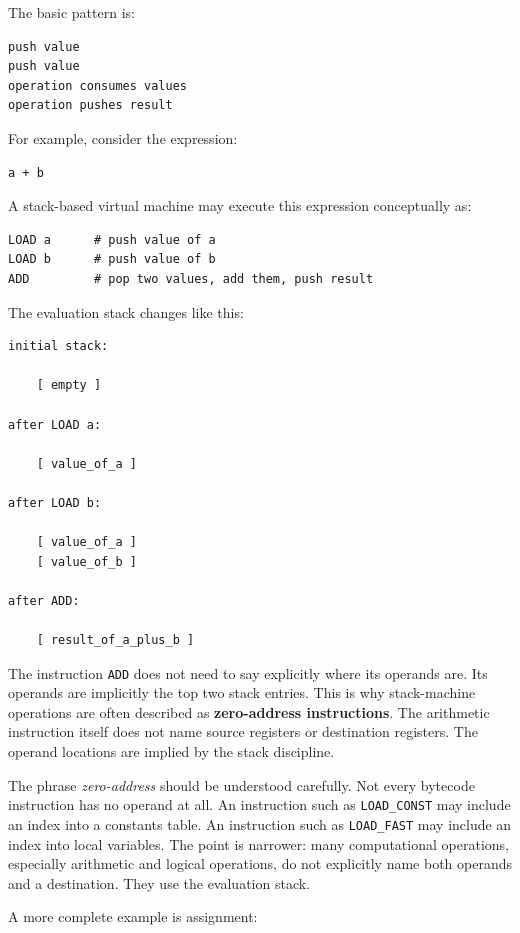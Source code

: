 \documentclass[a4paper,twoside]{report}
\begin{document}
The basic pattern is:

\begin{verbatim}
push value
push value
operation consumes values
operation pushes result
\end{verbatim}

For example, consider the expression:

\begin{verbatim}
a + b
\end{verbatim}

A stack-based virtual machine may execute this expression conceptually as:

\begin{verbatim}
LOAD a      # push value of a
LOAD b      # push value of b
ADD         # pop two values, add them, push result
\end{verbatim}

The evaluation stack changes like this:

\begin{verbatim}
initial stack:

    [ empty ]

after LOAD a:

    [ value_of_a ]

after LOAD b:

    [ value_of_a ]
    [ value_of_b ]

after ADD:

    [ result_of_a_plus_b ]
\end{verbatim}

The instruction \texttt{ADD} does not need to say explicitly where its operands are. Its operands are implicitly the top two stack entries. This is why stack-machine operations are often described as \textbf{zero-address instructions}. The arithmetic instruction itself does not name source registers or destination registers. The operand locations are implied by the stack discipline.

The phrase \emph{zero-address} should be understood carefully. Not every bytecode instruction has no operand at all. An instruction such as \texttt{LOAD\_CONST} may include an index into a constants table. An instruction such as \texttt{LOAD\_FAST} may include an index into local variables. The point is narrower: many computational operations, especially arithmetic and logical operations, do not explicitly name both operands and a destination. They use the evaluation stack.

A more complete example is assignment:
\end{document}

